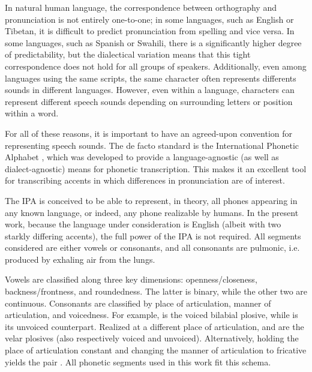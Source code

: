 In natural human language, the correspondence between orthography and pronunciation 
is not entirely one-to-one; in some languages, such as English or Tibetan, it is 
difficult to predict pronunciation from spelling and vice versa. In some languages, 
such as Spanish or Swahili, there is a significantly higher degree of predictability, 
but the dialectical variation means that this tight correspondence does not hold for 
all groups of speakers. Additionally, even among languages using the same scripts, 
the same character often represents differents sounds in different languages. However, 
even within a language, characters can represent different speech sounds depending on 
surrounding letters or position within a word.

For all of these reasons, it is important to have an agreed-upon convention for 
representing speech sounds. The de facto standard is the International Phonetic Alphabet 
\citep{ipa,handbookofphonetics}, 
which was developed to provide a language-agnostic (as well as dialect-agnostic) means 
for phonetic transcription.
This makes it an excellent tool for transcribing accents in which differences in pronunciation 
are of interest.

The IPA is conceived to be able to represent, in theory, all phones appearing in any 
known language, or indeed, any phone realizable by humans. In the present work, because 
the language under consideration is English (albeit with two starkly differing accents), 
the full power of the IPA is not required. All segments considered are either vowels 
or consonants, and all consonants are pulmonic, i.e. produced by exhaling air from the lungs.

Vowels are classified along three key dimensions: openness/closeness, backness/frontness,
and roundedness. The latter is binary, while the other two are continuous.
Consonants are classified by place of articulation, manner of articulation, and voicedness. 
For example,  is the voiced bilabial plosive, while  is its unvoiced 
counterpart. Realized at a different place of articulation,  and  
are the velar plosives (also respectively voiced and unvoiced). 
Alternatively, holding the place of articulation constant and changing the manner of 
articulation to fricative yields the pair . All phonetic segments used in this work fit this schema.